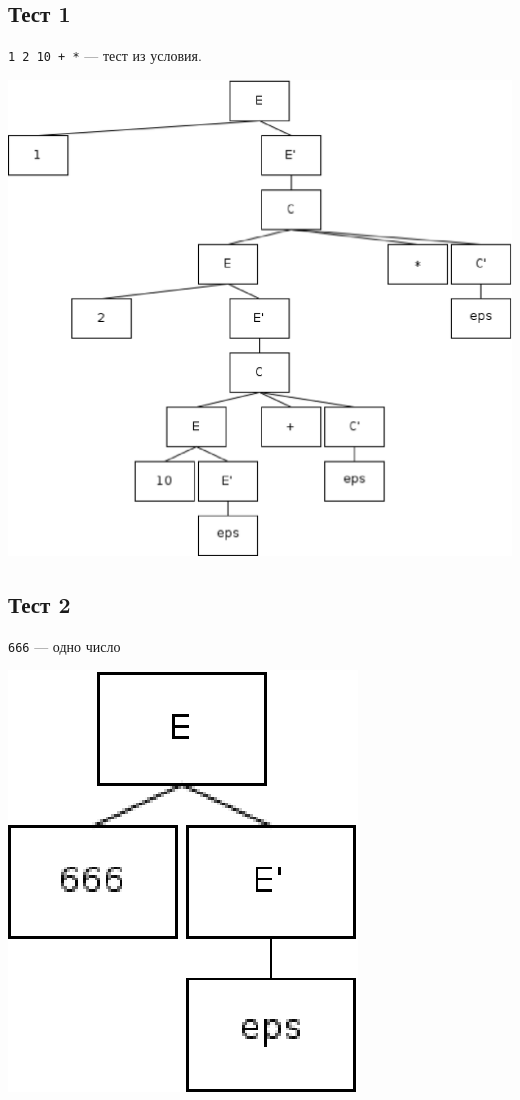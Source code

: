 \subsection{Тест 1}

\texttt{1 2 10 + *} --- тест из условия.

\includegraphics{test1.eps} 

\subsection{Тест 2}

\texttt{666} --- одно число

\includegraphics{test2.eps}

